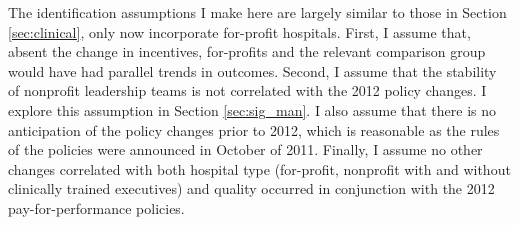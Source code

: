 \documentclass[12pt]{article}
\begin{document}
    The identification assumptions I make here are largely similar to those in Section \ref{sec:clinical}, only now incorporate for-profit hospitals. First, I assume that, absent the change in incentives, for-profits and the relevant comparison group would have had parallel trends in outcomes. Second, I assume that the stability of nonprofit leadership teams is not correlated with the 2012 policy changes. I explore this assumption in Section \ref{sec:sig_man}. I also assume that there is no anticipation of the policy changes prior to 2012, which is reasonable as the rules of the policies were announced in October of 2011. Finally, I assume no other changes correlated with both hospital type (for-profit, nonprofit with and without clinically trained executives) and quality occurred in conjunction with the 2012 pay-for-performance policies.
\end{document}
